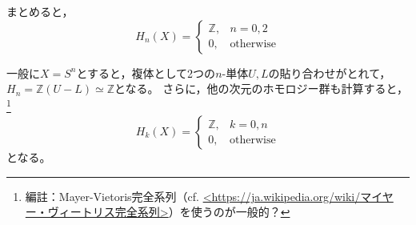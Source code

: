 \documentclass[uplatex]{jsarticle}
\begin{document}
\begin{rei}[球面のホモロジー群]
	まとめると，
	\begin{equation}
		H_{n}(X) = \begin{cases}
			\mathbb{Z}, & n=0, 2 \\
			0, & \text{otherwise}
		\end{cases}
	\end{equation}
\end{rei}

\begin{rei}[超球面のホモロジー群]
	一般に$X = S^{n}$とすると，複体として2つの$n$-単体$U,L$の貼り合わせがとれて，
	$H_{n} = \mathbb{Z} (U - L) \simeq \mathbb{Z}$となる。
	さらに，他の次元のホモロジー群も計算すると，\footnote{編註：Mayer-Vietoris完全系列（cf. \url{<https://ja.wikipedia.org/wiki/マイヤー・ヴィートリス完全系列>}）を使うのが一般的？}\
	\begin{equation}
		H_{k} (X) = \begin{cases}
			\mathbb{Z}, & k = 0, n \\
			0, & \text{otherwise}
		\end{cases}
	\end{equation}
	となる。
\end{rei}
\end{document}
